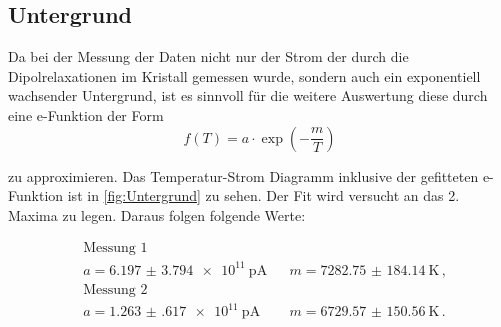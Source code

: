 \subsection{Untergrund}

Da bei der Messung der Daten nicht nur der Strom der durch die Dipolrelaxationen im Kristall gemessen wurde, sondern auch ein exponentiell wachsender Untergrund, ist es sinnvoll
für die weitere Auswertung diese durch eine e-Funktion der Form 
\begin{equation*}
  f(T) = a \cdot \exp(-\frac{m}{T})
\end{equation*}

\noindent 
zu approximieren. Das Temperatur-Strom Diagramm inklusive der gefitteten e-Funktion ist in \autoref{fig:Untergrund} zu sehen. Der Fit wird versucht an das 2. Maxima zu legen. 
Daraus folgen folgende Werte:

\begin{align*}
  &\text{Messung 1}\\
  &a =  \SI{6.197(3794)e11}{\pico\ampere} &&  m = \SI{7282.75(18414)}{\kelvin} \, ,\\
  &\text{Messung 2}\\
  &a = \SI{1.263(617)e11}{\pico\ampere} &&  m = \SI{6729.57(15056)}{\kelvin} \, .\\ 
\end{align*}


